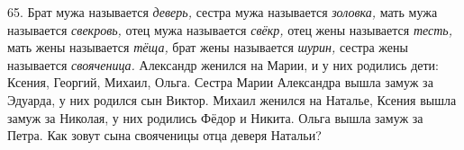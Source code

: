 65. Брат мужа называется {\it деверь,} сестра мужа называется {\it золовка,} мать мужа называется {\it свекровь,} отец мужа называется {\it свёкр,} отец жены называется {\it тесть,} мать жены называется {\it тёща,} брат жены называется {\it шурин,} сестра жены называется {\it свояченица.} Александр женился на Марии, и у них родились дети: Ксения, Георгий, Михаил, Ольга. Сестра Марии Александра вышла замуж за Эдуарда, у них родился сын Виктор. Михаил женился на Наталье, Ксения вышла замуж за Николая, у них родились Фёдор и Никита. Ольга вышла замуж за Петра. Как зовут сына свояченицы отца деверя Натальи?\\
